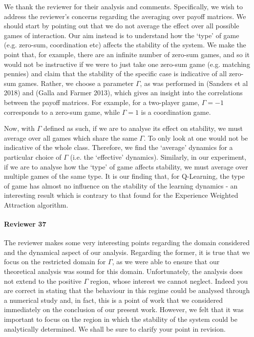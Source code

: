 \documentclass{article}
\begin{document}
We thank the reviewer for their analysis and comments. Specifically, we wish to address the
reviewer's concerns regarding the averaging over payoff matrices. We should start by pointing out
that we do not average the effect over all possible games of interaction. Our aim instead is to
understand how the `type' of game (e.g. zero-sum, coordination etc) affects the stability of the
system. We make the point that, for example, there are an infinite number of zero-sum games, and so
it would not be instructive if we were to just take one zero-sum game (e.g. matching pennies) and
claim that the stability of the specific case is indicative of all zero-sum games. Rather, we choose
a parameter $\Gamma$, as was performed in (Sanders et al 2018) and (Galla and Farmer 2013), which
gives an insight into the correlations between the payoff matrices. For example, for a two-player
game, $\Gamma = -1$ corresponds to a zero-sum game, while $\Gamma = 1$ is a coordination game.

Now, with $\Gamma$ defined as such, if we are to analyse its effect on stability, we must average
over all games which share the same $\Gamma$. To only look at one would not be indicative of the
whole class. Therefore, we find the `average' dynamics for a particular choice of $\Gamma$ (i.e.
the `effective' dynamics). Similarly, in our experiment, if we are to analyse how the `type' of game
affects stability, we must average over multiple games of the same type. It is our finding that, for
Q-Learning, the type of game has almost no influence on the stability of the learning dynamics - an
interesting result which is contrary to that found for the Experience Weighted Attraction algorithm.


\paragraph{Reviewer 37} %
\label{par:reviewer_37}

The reviewer makes some very interesting points regarding the domain considered and the dynamical
aspect of our analysis. Regarding the former, it is true that we focus on the restricted domain for
$\Gamma$, as we were able to ensure that our theoretical analysis was sound for this domain.
Unfortunately, the analysis does not extend to the positive $\Gamma$ region, whose interest we
cannot neglect. Indeed you are correct in stating that the behaviour in this regime could be
analysed through a numerical study and, in fact, this is a point of work that we considered
immediately on the conclusion of our present work. However, we felt that it was important to focus
on the region in which the stability of the system could be analytically determined. We shall be
sure to clarify your point in revision.
\end{document}
